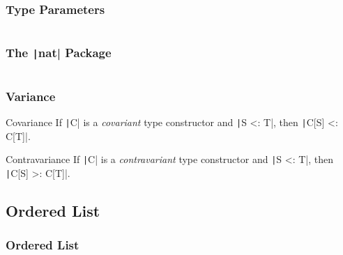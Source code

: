 \documentclass[10pt, usenames, dvipsnames, table]{beamer}
\begin{document}
\begin{frame}
  \frametitle{Type Parameters}
  \inputminted[fontsize=\small]{Scala}{../examples/Ord.scala}
\end{frame}

\begin{frame}
  \frametitle{The \texttt|nat| Package}
  \inputminted[firstline=1, lastline=28, fontsize=\tiny]
  {Scala}{../examples/Nat.scala}
  \vspace{-0.25\linewidth}
  \pause{}
\end{frame}

\begin{frame}
  \frametitle{Variance}
  \begin{block}{Covariance}
    If \texttt|C| is a \emph{covariant} type constructor and
    \texttt|S <: T|, then \texttt|C[S] <: C[T]|.
  \end{block}
  \pause{}
  \begin{block}{Contravariance}
    If \texttt|C| is a \emph{contravariant} type constructor and
    \texttt|S <: T|, then \texttt|C[S] >: C[T]|.
  \end{block}
\end{frame}

\subsection{Ordered List}
\begin{frame}
  \frametitle{Ordered List}
  \inputminted[firstline=1, fontsize=\tiny]
  {Scala}{../examples/OrdList.scala}
\end{frame}
\end{document}
